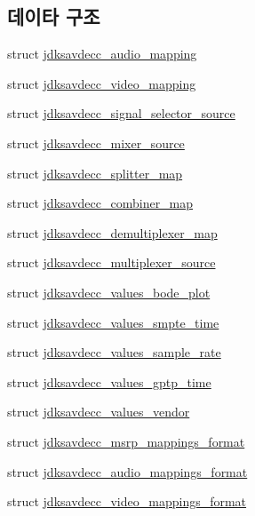 \subsection*{데이타 구조}
\begin{DoxyCompactItemize}
\item 
struct \hyperlink{structjdksavdecc__audio__mapping}{jdksavdecc\+\_\+audio\+\_\+mapping}
\item 
struct \hyperlink{structjdksavdecc__video__mapping}{jdksavdecc\+\_\+video\+\_\+mapping}
\item 
struct \hyperlink{structjdksavdecc__signal__selector__source}{jdksavdecc\+\_\+signal\+\_\+selector\+\_\+source}
\item 
struct \hyperlink{structjdksavdecc__mixer__source}{jdksavdecc\+\_\+mixer\+\_\+source}
\item 
struct \hyperlink{structjdksavdecc__splitter__map}{jdksavdecc\+\_\+splitter\+\_\+map}
\item 
struct \hyperlink{structjdksavdecc__combiner__map}{jdksavdecc\+\_\+combiner\+\_\+map}
\item 
struct \hyperlink{structjdksavdecc__demultiplexer__map}{jdksavdecc\+\_\+demultiplexer\+\_\+map}
\item 
struct \hyperlink{structjdksavdecc__multiplexer__source}{jdksavdecc\+\_\+multiplexer\+\_\+source}
\item 
struct \hyperlink{structjdksavdecc__values__bode__plot}{jdksavdecc\+\_\+values\+\_\+bode\+\_\+plot}
\item 
struct \hyperlink{structjdksavdecc__values__smpte__time}{jdksavdecc\+\_\+values\+\_\+smpte\+\_\+time}
\item 
struct \hyperlink{structjdksavdecc__values__sample__rate}{jdksavdecc\+\_\+values\+\_\+sample\+\_\+rate}
\item 
struct \hyperlink{structjdksavdecc__values__gptp__time}{jdksavdecc\+\_\+values\+\_\+gptp\+\_\+time}
\item 
struct \hyperlink{structjdksavdecc__values__vendor}{jdksavdecc\+\_\+values\+\_\+vendor}
\item 
struct \hyperlink{structjdksavdecc__msrp__mappings__format}{jdksavdecc\+\_\+msrp\+\_\+mappings\+\_\+format}
\item 
struct \hyperlink{structjdksavdecc__audio__mappings__format}{jdksavdecc\+\_\+audio\+\_\+mappings\+\_\+format}
\item 
struct \hyperlink{structjdksavdecc__video__mappings__format}{jdksavdecc\+\_\+video\+\_\+mappings\+\_\+format}
\item 

\end{DoxyCompactItemize}
